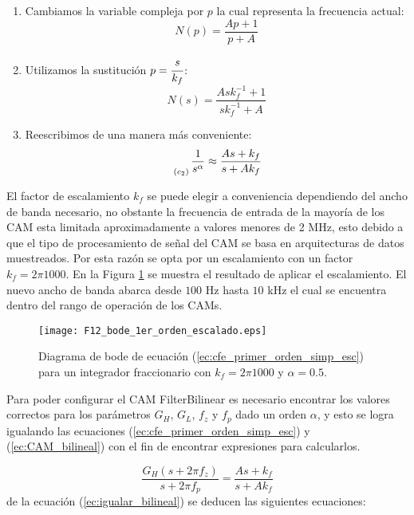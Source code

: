 	\begin{enumerate}
		\item Cambiamos la variable compleja por $p$ la cual representa la frecuencia actual:
			\begin{equation}
				N(p) =  \frac{A p + 1}{p + A}
			\end{equation}
		\item Utilizamos la sustitución $p = \cfrac{s}{k_{f}}$:
			\begin{equation}
				N(s) =  \frac{A s k_{f}^{-1} + 1}{s k_{f}^{-1} + A}
			\end{equation}
		\item Reescribimos de una manera más conveniente:
			\begin{equation}
				\genfrac{}{}{0pt}{0}{}{_{(c_{2})}} \frac{1}{s^{\alpha}} \approx \frac{A s + k_{f}}{s + A k_{f}}
				\label{ec:cfe_primer_orden_simp_esc}
			\end{equation}
	\end{enumerate}		
	El factor de escalamiento $k_{f}$ se puede elegir a conveniencia dependiendo del ancho de banda necesario, no obstante la frecuencia de entrada de la mayoría de los CAM esta limitada aproximadamente a valores menores de 2 MHz, esto debido a que el tipo de procesamiento de señal del CAM se basa en arquitecturas de datos muestreados. Por esta razón se opta por un escalamiento con un factor $k_{f} = 2\pi 1000$. En la Figura \ref{fig:F12_bode_1er_orden_escalado.eps} se muestra el resultado de aplicar el escalamiento. El nuevo ancho de banda abarca desde $100$ Hz hasta $10$ kHz el cual se encuentra dentro del rango de operación de los CAMs.
	
\begin{figure}[hbtp]
\caption{Diagrama de bode de ecuación (\ref{ec:cfe_primer_orden_simp_esc}) para un integrador fraccionario con $k_{f} = 2\pi 1000$ y  $\alpha = 0.5$.} 
\label{fig:F12_bode_1er_orden_escalado.eps}
\centering
\texttt{[image: F12\_bode\_1er\_orden\_escalado.eps]}
\end{figure}
	
	 Para poder configurar el CAM FilterBilinear es necesario encontrar los valores correctos para los parámetros $G_{H}$, $G_{L}$, $f_{z}$ y $f_{p}$ dado un orden $\alpha$, y esto se logra igualando las ecuaciones (\ref{ec:cfe_primer_orden_simp_esc}) y (\ref{ec:CAM_bilineal}) con el fin de encontrar expresiones para calcularlos.
	 
	 \begin{equation}
	 \frac{G_{H}(s + 2 \pi f_{z})}{s + 2 \pi f_{p}} = \frac{As + k_{f}}{s + A k_{f}}
	 \label{ec:igualar_bilineal}
	 \end{equation}
	 de la ecuación (\ref{ec:igualar_bilineal}) se deducen las siguientes ecuaciones:
	 
